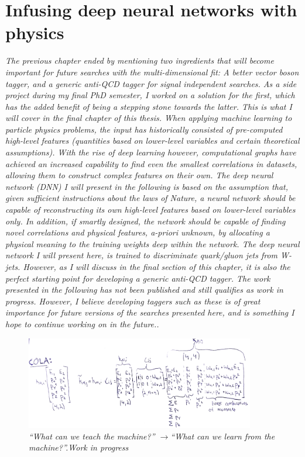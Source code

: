 \vspace*{\fill}
\section{Infusing deep neural networks with physics}
\label{sec:lolaintro}
\begin{centering}
\textit{
The previous chapter ended by mentioning two ingredients that will become important for future searches with the multi-dimensional fit: A better vector boson tagger, and a generic anti-QCD tagger for signal independent searches. As a side project during my final PhD semester, I worked on a solution for the first, which has the added benefit of being a stepping stone towards the latter. This is what I will cover in the final chapter of this thesis.
\newline
\newline
When applying machine learning to particle physics problems, the input has historically consisted of pre-computed high-level features (quantities based on lower-level variables and certain theoretical assumptions).
With the rise of deep learning however, computational graphs have achieved an increased capability to find even the smallest correlations in datasets, allowing them to construct complex features on their own. The deep neural network (DNN) I will present in the following is based on the assumption that, given sufficient instructions about the laws of Nature, a neural network should be capable of reconstructing its own high-level features based on lower-level variables only. In addition, if smartly designed, the network should be capable of finding novel correlations and physical features, a-priori unknown, by allocating a physical meaning to the training weights deep within the network. The deep neural network I will present here, is trained to discriminate quark/gluon jets from W-jets. However, as I will discuss in the final section of this chapter, it is also the perfect starting point for developing a generic anti-QCD tagger.
\newline
\newline
The work presented in the following has not been published and still qualifies as work in progress. However, I believe developing taggers such as these is of great importance for future versions of the searches presented here, and is something I hope to continue working on in the future..
}
\begin{figure}[b!] 
    \centering
    \includegraphics[width=10cm]{figures/vtagging/misc/cola.png}
    \vspace*{10mm}
    \caption*{\footnotesize{\textit{ ``What can we teach the machine?'' $\rightarrow$``What can we learn from the machine?''.\newline Work in progress}}}
\end{figure}
\end{centering}
